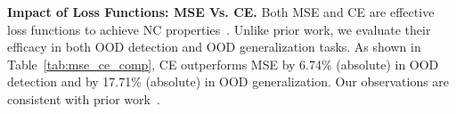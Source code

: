 \noindent
\textbf{Impact of Loss Functions: MSE Vs. CE.}
Both MSE and CE are effective loss functions to achieve NC properties~\cite{zhou2022all}. Unlike prior work, we evaluate their efficacy in both OOD detection and OOD generalization tasks.
As shown in Table~\ref{tab:mse_ce_comp}, CE outperforms MSE by 6.74\% (absolute) in OOD detection and by 17.71\% (absolute) in OOD generalization.
Our observations are consistent with prior work~\cite{kornblith2021better, hui2020evaluation}. %


